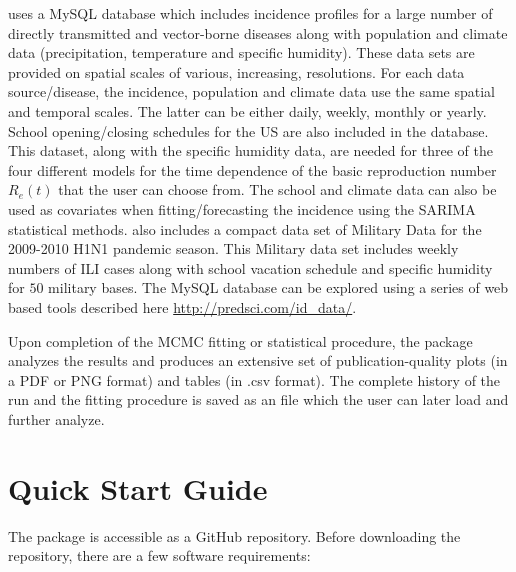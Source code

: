 \documentclass[a4paper]{article}
\begin{document}
 uses a MySQL database which includes incidence profiles for a large number of directly transmitted and vector-borne diseases along with population and climate data (precipitation, temperature and specific humidity). These data sets are provided on spatial scales of various, increasing, resolutions. For each data source/disease, the incidence, population and climate data use the same spatial and temporal scales. The latter can be either daily, weekly, monthly or yearly. School opening/closing schedules for the US are also included in the database. This dataset, along with the specific humidity data, are needed for three of the four different models for the time dependence of the basic reproduction number $R_{e}(t)$ that the user can choose from. The school and climate data can also be used as covariates when fitting/forecasting the incidence using the SARIMA statistical methods.  also includes a compact data set of Military Data for the 2009-2010 H1N1 pandemic season.  This Military data set includes weekly numbers of ILI cases along with school vacation schedule and specific humidity for $50$ military bases. The  MySQL database can be explored using a series of web based tools described here \url{http://predsci.com/id_data/}.


Upon completion of the MCMC fitting or statistical procedure, the  package analyzes the results and produces an extensive set of publication-quality plots (in a  PDF or PNG format) and tables (in .csv format).
The complete history of the run and the fitting procedure is saved as an  file which the user can later load and further analyze.


\section{Quick Start Guide}
The  package is accessible as a GitHub repository.  Before downloading the repository, there are a few software requirements:
\end{document}
